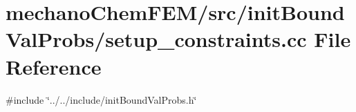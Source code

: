 \section{mechano\+Chem\+F\+E\+M/src/init\+Bound\+Val\+Probs/setup\+\_\+constraints.cc File Reference}
\label{setup__constraints_8cc}
{\ttfamily \#include \char`\"{}../../include/init\+Bound\+Val\+Probs.\+h\char`\"{}}\newline
